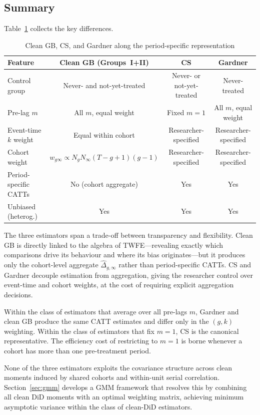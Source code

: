 \documentclass[12pt,letterpaper]{article}
\theoremstyle{remark}
\theoremstyle{definition}
\newcommand{\hDelta}{\hat{\Delta}}
\begin{document}
\subsection{Summary}
\label{sec:comparison_summary}

Table~\ref{tab:comparison} collects the key differences.

\begin{table}[ht]
\centering
\caption{Clean GB, CS, and Gardner along the period-specific representation}
\label{tab:comparison}
\begin{tabular}{lccc}
\toprule
Feature & Clean GB (Groups~I+II) & CS & Gardner \\
\midrule
Control group & Never- and not-yet-treated & Never- or not-yet-treated & Never-treated \\
Pre-lag $m$ & All $m$, equal weight & Fixed $m=1$ & All $m$, equal weight \\
Event-time $k$ weight & Equal within cohort & Researcher-specified & Researcher-specified \\
Cohort weight & $w_{g\infty}\propto N_gN_\infty(T{-}g{+}1)(g{-}1)$ & Researcher-specified & Researcher-specified \\
Period-specific CATTs & No (cohort aggregate) & Yes & Yes \\
Unbiased (heterog.) & Yes & Yes & Yes \\
\bottomrule
\end{tabular}
\end{table}

\noindent
The three estimators span a trade-off between transparency and flexibility.
Clean GB is directly linked to the algebra of TWFE---revealing exactly which
comparisons drive its behaviour and where its bias originates---but it produces
only the cohort-level aggregate $\hDelta_{g,\infty}$ rather than
period-specific CATTs. CS and Gardner decouple estimation from aggregation,
giving the researcher control over event-time and cohort weights, at the cost
of requiring explicit aggregation decisions.

Within the class of estimators that average over all pre-lags $m$, Gardner
and clean GB produce the same CATT estimates and differ only in the $(g,k)$
weighting. Within the class of estimators that fix $m=1$, CS is the canonical
representative. The efficiency cost of restricting to $m=1$ is borne whenever
a cohort has more than one pre-treatment period.

None of the three estimators exploits the covariance structure across clean
moments induced by shared cohorts and within-unit serial correlation.
Section~\ref{sec:gmm} develops a GMM framework that resolves this by combining
all clean DiD moments with an optimal weighting matrix, achieving minimum
asymptotic variance within the class of clean-DiD estimators.
\end{document}
